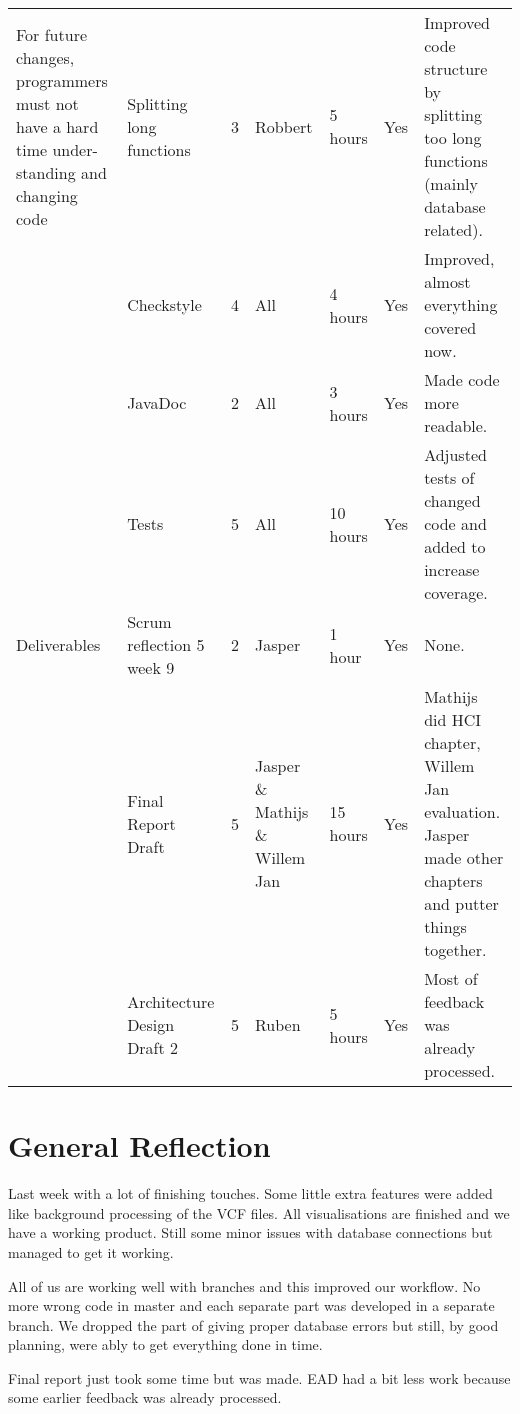 \documentclass[a4paper]{report}
\begin{document}
\begin{landscape}
\begin{longtable}{p{3cm}|p{3cm}|p{1cm}|p{2cm}|l|l|p{5cm}}
For future changes, programmers must not have a hard time under- standing and changing code
& Splitting long functions & 3 & Robbert & 5 hours & Yes & Improved code structure by splitting too long functions (mainly database related). \\
& Checkstyle & 4 & All & 4 hours & Yes & Improved, almost everything covered now. \\
& JavaDoc & 2 & All & 3 hours & Yes & Made code more readable. \\
& Tests & 5 & All & 10 hours & Yes & Adjusted tests of changed code and added to increase coverage. \\
\hline

Deliverables
& Scrum reflection 5 week 9 & 2 & Jasper & 1 hour & Yes & None.\\
& Final Report Draft & 5 & Jasper \& Mathijs \& Willem Jan & 15 hours & Yes & Mathijs did HCI chapter, Willem Jan evaluation. Jasper made other chapters and putter things together. \\
& Architecture Design Draft 2 & 5 & Ruben & 5 hours & Yes & Most of feedback was already processed. \\
\hline
\end{longtable}
\end{landscape}

\section*{General Reflection}
Last week with a lot of finishing touches. Some little extra features were added like background processing of the VCF files. All visualisations are finished and we have a working product. Still some minor issues with database connections but managed to get it working.

All of us are working well with branches and this improved our workflow. No more wrong code in master and each separate part was developed in a separate branch. We dropped the part of giving proper database errors but still, by good planning, were ably to get everything done in time.

Final report just took some time but was made. EAD had a bit less work because some earlier feedback was already processed. \\
\end{document}

